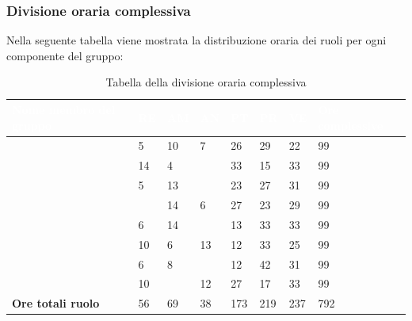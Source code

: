\subsubsection{Divisione oraria complessiva} 
Nella seguente tabella viene mostrata la distribuzione oraria dei ruoli per ogni componente del gruppo:
{
	\renewcommand{\arraystretch}{2}

	\begin{longtable}{ C{5cm} C{1cm} C{1cm} C{1cm} C{1cm} C{1cm} C{1cm} C{3cm}}
	\caption{Tabella della divisione oraria complessiva}\\
		\textcolor{white}{\textbf{Nome membro del gruppo}} & 
		\textcolor{white}{\textbf{RE}} & 
		\textcolor{white}{\textbf{AM}} & 
		\textcolor{white}{\textbf{AN}} & 
		\textcolor{white}{\textbf{PT}} & 
		\textcolor{white}{\textbf{PR}} & 
		\textcolor{white}{\textbf{VE}} & 
		\textcolor{white}{\textbf{Ore complessive}}\\	
		\endhead
        
        \MC{} & 5 & 10 & 7 & 26 & 29 & 22 & 99 \\
        \LD{} & 14 & 4 & & 33 & 15 & 33 & 99\\
        \CE{} & 5 & 13 & & 23 & 27 & 31 & 99 \\
        \SE{} & & 14 & 6 & 27 & 23 & 29 & 99\\
        \PF{} & 6 & 14 & & 13 & 33 & 33 & 99\\
        \DF{} & 10 & 6 & 13 & 12 & 33 & 25 & 99 \\
        \BR{} & 6 & 8 & & 12 & 42 & 31 & 99 \\
       \AT{} & 10 & & 12 & 27 & 17 & 33 & 99 \\
        \textbf{Ore totali ruolo} & 56 & 69 & 38 & 173 & 219 & 237 &  792 \\

	\end{longtable}

}
